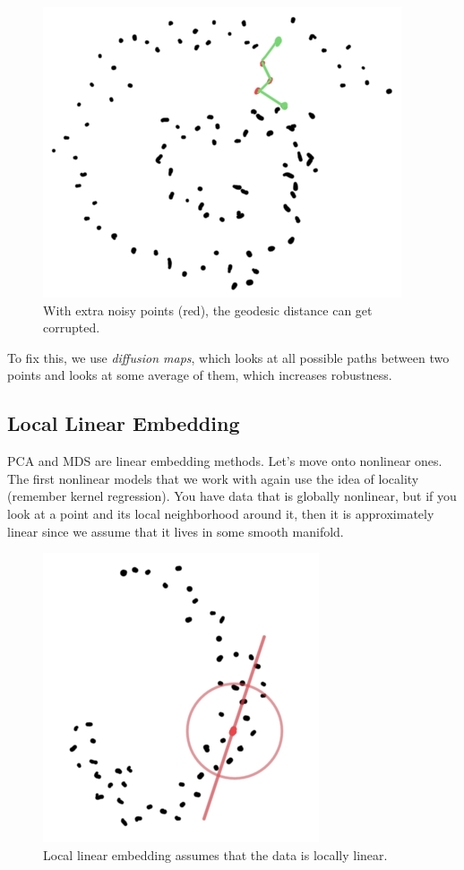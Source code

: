     \begin{figure}[H]
      \centering 
      \includegraphics[scale=0.4]{img/isomap_problem.png}
      \caption{With extra noisy points (red), the geodesic distance can get corrupted.} 
      \label{fig:isomap_problem}
    \end{figure}

    To fix this, we use \textit{diffusion maps}, which looks at all possible paths between two points and looks at some average of them, which increases robustness. 

  \subsection{Local Linear Embedding} 

    PCA and MDS are linear embedding methods. Let's move onto nonlinear ones. The first nonlinear models that we work with again use the idea of locality (remember kernel regression). You have data that is globally nonlinear, but if you look at a point and its local neighborhood around it, then it is approximately linear since we assume that it lives in some smooth manifold. 

    \begin{figure}[H]
      \centering 
      \includegraphics[scale=0.4]{img/local_linear_embedding.png}
      \caption{Local linear embedding assumes that the data is locally linear. } 
      \label{fig:local_linear_embedding}
    \end{figure}

